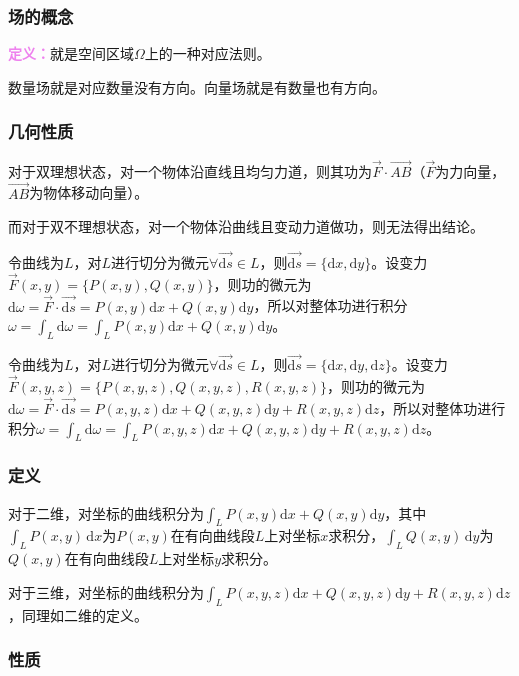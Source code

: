 \documentclass[UTF8, 12pt]{ctexart}
\begin{document}
\subsubsection{场的概念}

\textcolor{violet}{\textbf{定义：}}就是空间区域$\Omega$上的一种对应法则。

数量场就是对应数量没有方向。向量场就是有数量也有方向。

\subsubsection{几何性质}

对于双理想状态，对一个物体沿直线且均匀力道，则其功为$\vec{F}\cdot\overrightarrow{AB}$（$\vec{F}$为力向量，$\overrightarrow{AB}$为物体移动向量）。

而对于双不理想状态，对一个物体沿曲线且变动力道做功，则无法得出结论。

令曲线为$L$，对$L$进行切分为微元$\forall\overrightarrow{\textrm{d}s}\in L$，则$\overrightarrow{\textrm{d}s}=\{\textrm{d}x,\textrm{d}y\}$。设变力$\vec{F}(x,y)=\{P(x,y),Q(x,y)\}$，则功的微元为$\textrm{d}\omega=\vec{F}\cdot\overrightarrow{\textrm{d}s}=P(x,y)\textrm{d}x+Q(x,y)\textrm{d}y$，所以对整体功进行积分$\omega=\int_L\textrm{d}\omega=\int_LP(x,y)\textrm{d}x+Q(x,y)\textrm{d}y$。

令曲线为$L$，对$L$进行切分为微元$\forall\overrightarrow{\textrm{d}s}\in L$，则$\overrightarrow{\textrm{d}s}=\{\textrm{d}x,\textrm{d}y,\textrm{d}z\}$。设变力$\vec{F}(x,y,z)=\{P(x,y,z),Q(x,y,z),R(x,y,z)\}$，则功的微元为$\textrm{d}\omega=\vec{F}\cdot\overrightarrow{\textrm{d}s}=P(x,y,z)\textrm{d}x+Q(x,y,z)\textrm{d}y+R(x,y,z)\textrm{d}z$，所以对整体功进行积分$\omega=\int_L\textrm{d}\omega=\int_LP(x,y,z)\textrm{d}x+Q(x,y,z)\textrm{d}y+R(x,y,z)\textrm{d}z$。

\subsubsection{定义}

对于二维，对坐标的曲线积分为$\int_LP(x,y)\textrm{d}x+Q(x,y)\textrm{d}y$，其中$\int_LP(x,y)\,\textrm{d}x$为$P(x,y)$在有向曲线段$L$上对坐标$x$求积分，$\int_LQ(x,y)\,\textrm{d}y$为$Q(x,y)$在有向曲线段$L$上对坐标$y$求积分。

对于三维，对坐标的曲线积分为$\int_LP(x,y,z)\textrm{d}x+Q(x,y,z)\textrm{d}y+R(x,y,z)\textrm{d}z$，同理如二维的定义。

\subsubsection{性质}
\end{document}
